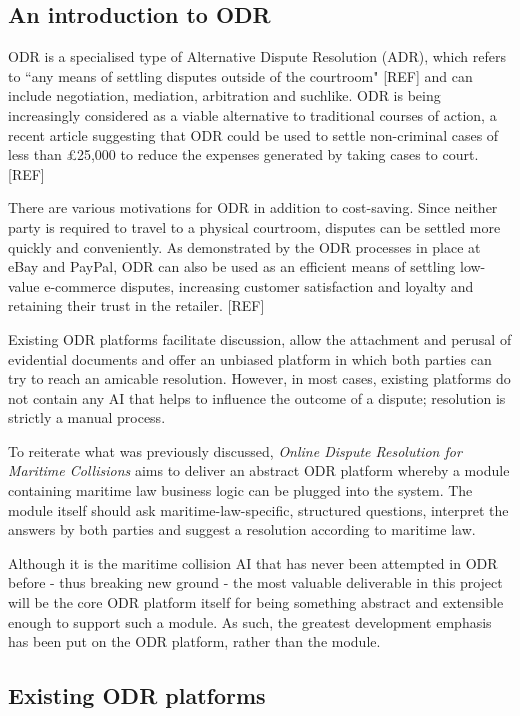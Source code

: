 \subsection{An introduction to ODR}

ODR is a specialised type of Alternative Dispute Resolution (ADR), which refers to ``any means of settling disputes outside of the courtroom" [REF] and can include negotiation, mediation, arbitration and suchlike. ODR is being increasingly considered as a viable alternative  to traditional courses of action, a recent article suggesting that ODR could be used to settle non-criminal cases of less than \pounds25,000 to reduce the expenses generated by taking cases to court. [REF]%

There are various motivations for ODR in addition to cost-saving. Since neither party is required to travel to a physical courtroom, disputes can be settled more quickly and conveniently. As demonstrated by the ODR processes in place at eBay and PayPal, ODR can also be used as an efficient means of settling low-value e-commerce disputes, increasing customer satisfaction and loyalty and retaining their trust in the retailer. [REF]

Existing ODR platforms facilitate discussion, allow the attachment and perusal of evidential documents and offer an unbiased platform in which both parties can try to reach an amicable resolution. However, in most cases, existing platforms do not contain any AI that helps to influence the outcome of a dispute; resolution is strictly a manual process.

To reiterate what was previously discussed, \emph{Online Dispute Resolution for Maritime Collisions} aims to deliver an abstract ODR platform whereby a module containing maritime law business logic can be plugged into the system. The module itself should ask maritime-law-specific, structured questions, interpret the answers by both parties and suggest a resolution according to maritime law.

Although it is the maritime collision AI that has never been attempted in ODR before - thus breaking new ground - the most valuable deliverable in this project will be the core ODR platform itself for being something abstract and extensible enough to support such a module. As such, the greatest development emphasis has been put on the ODR platform, rather than the module.

\subsection{Existing ODR platforms}

